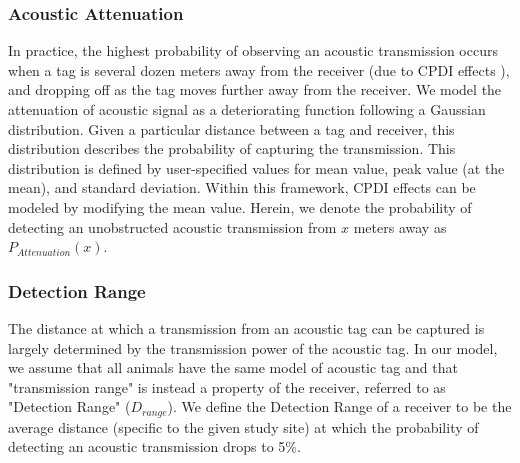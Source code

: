 \subsubsection{Acoustic Attenuation}
\label{acousticAttenuation}
In practice, the highest probability of observing an acoustic transmission occurs when a tag is several dozen meters away from the receiver (due to CPDI effects \cite{Kessel2015}), and dropping off as the tag moves further away from the receiver.  We model the attenuation of acoustic signal as a deteriorating function following a Gaussian distribution.  Given a particular distance between a tag and receiver, this distribution describes the probability of capturing the transmission.  This distribution is defined by user-specified values for mean value, peak value (at the mean),  and standard deviation.  Within this framework, CPDI effects can be modeled by modifying the mean value.  Herein, we denote the probability of detecting an unobstructed acoustic transmission from $x$ meters away as $P_{Attenuation}(x)$.

\subsubsection{Detection Range}
\label{detectionRange}
The distance at which a transmission from an acoustic tag can be captured is largely determined by the transmission power of the acoustic tag.  In our model, we assume that all animals have the same model of acoustic tag and that "transmission range" is instead a property of the receiver, referred to as "Detection Range" ($D_{range}$).  We define the Detection Range of a receiver to be the average distance (specific to the given study site) at which the probability of detecting an acoustic transmission drops to 5\%.

